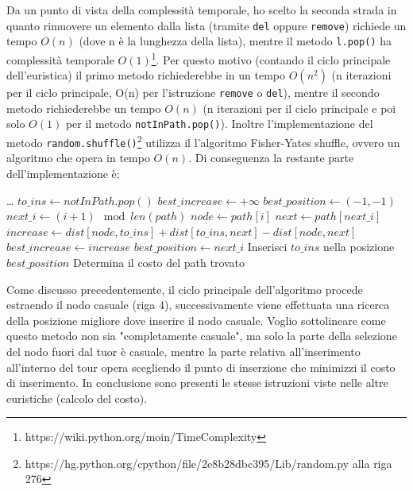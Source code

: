 \documentclass[a4paper,12pt]{report}
\begin{document}
Da un punto di vista della complessità temporale, ho scelto la seconda strada in quanto rimuovere un elemento dalla lista (tramite \lstinline!del! oppure \lstinline!remove!) richiede un tempo $O(n)$ (dove n è la lunghezza della lista), mentre il metodo \lstinline!l.pop()! ha complessità temporale $O(1)$\footnote{https://wiki.python.org/moin/TimeComplexity}. Per questo motivo (contando il ciclo principale dell'euristica) il primo metodo richiederebbe in un tempo $O(n^2)$ (n iterazioni per il ciclo principale, O(n) per l'istruzione \lstinline!remove! o \lstinline!del!), mentre il secondo metodo richiederebbe un tempo $O(n)$ (n iterazioni per il ciclo principale e poi solo $O(1)$ per il metodo \lstinline!notInPath.pop()!). Inoltre l'implementazione del metodo \lstinline!random.shuffle()!\footnote{https://hg.python.org/cpython/file/2e8b28dbc395/Lib/random.py alla riga 276} utilizza il l'algoritmo Fisher-Yates shuffle\cite{knuthart}, ovvero un algoritmo che opera in tempo $O(n)$. Di conseguenza la restante parte dell'implementazione è:
\begin{tcolorbox}[colframe=black, colback=white, boxrule=0.5pt, title=Random Insertion Versione 1, coltitle=black, fonttitle=\bfseries, colbacktitle=white, breakable]
\begin{algorithmic}[1]
  \State \dots
    \State $to\_ins \gets notInPath.pop()$
    \State $best\_increase \gets +\infty$
    \State $best\_position \gets (-1, -1)$
      \State $next\_i \gets (i + 1) \mod len(path)$
      \State $node \gets path[i]$
      \State $next \gets path[next\_i]$
      \State $increase \gets dist[node, to\_ins] + dist[to\_ins, next] - dist[node, next]$
        \State $best\_increase \gets increase$
        \State $best\_position \gets next\_i$
      \EndIf
    \EndFor
    \State Inserisci $to\_ins$ nella posizione $best\_position$
  \EndWhile
  \State Determina il costo del path trovato
\end{algorithmic}
\end{tcolorbox}
Come discusso precedentemente, il ciclo principale dell'algoritmo procede estraendo il nodo casuale (riga 4), successivamente viene effettuata una ricerca della posizione migliore dove inserire il nodo casuale. Voglio sottolineare come questo metodo non sia "completamente casuale", ma solo la parte della selezione del nodo fuori dal tuor è casuale, mentre la parte relativa all'inserimento all'interno del tour opera scegliendo il punto di inserzione che minimizzi il costo di inserimento. \newline
In conclusione sono presenti le stesse istruzioni viste nelle altre euristiche (calcolo del costo).
\end{document}
